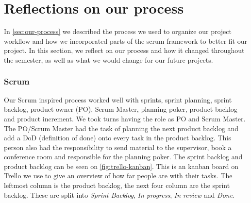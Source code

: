 \section{Reflections on our process}
In \autoref{sec:our-process} we described the process we used to organize our project workflow and how we incorporated parts of the scrum framework to better fit our project.
In this section, we reflect on our process and how it changed throughout the semester, as well as what we would change for our future projects.

\subsubsection{Scrum}
Our Scrum inspired process worked well with sprints, sprint planning, sprint backlog, product owner (PO), Scrum Master, planning poker, product backlog and product increment.
We took turns having the role as PO and Scrum Master.
The PO/Scrum Master had the task of planning the next product backlog and add a DoD (definition of done) onto every task in the product backlog.
This person also had the responsibility to send material to the supervisor, book a conference room and responsible for the planning poker.
The sprint backlog and product backlog can be seen on \autoref{fig:trello-kanban}. 
This is an kanban board on Trello we use to give an overview of how far people are with their tasks.
The leftmost column is the product backlog, the next four column are the sprint backlog.
These are split into \textit{Sprint Backlog}, \textit{In progress}, \textit{In review} and \textit{Done}.

